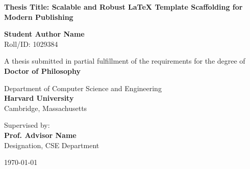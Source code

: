 \begin{titlepage}
\begin{center}
    \vspace*{1cm}
    
    
    \vspace{1.5cm}
    
    {\huge \bfseries \color{primary} Thesis Title: Scalable and Robust LaTeX Template Scaffolding for Modern Publishing}
    
    \vspace{1.5cm}
    
    {\Large \bfseries Student Author Name} \\
    \vspace{0.2cm}
    {Roll/ID: 1029384}
    
    \vspace{1.5cm}
    
    {A thesis submitted in partial fulfillment of the requirements for the degree of} \\
    \vspace{0.3cm}
    {\large \bfseries \color{secondary} Doctor of Philosophy}
    
    \vspace{1.5cm}
    
    {\large Department of Computer Science and Engineering} \\
    \vspace{0.2cm}
    {\large \bfseries \color{primary} Harvard University} \\
    \vspace{0.1cm}
    {Cambridge, Massachusetts}
    
    \vfill
    
    {Supervised by:} \\
    {\large \bfseries Prof. Advisor Name} \\
    {Designation, CSE Department}
    
    \vspace{1cm}
    
    {\large \today}
    
\end{center}
\end{titlepage}
